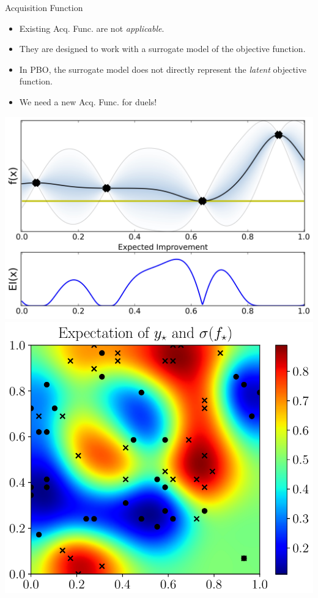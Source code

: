 \documentclass[13pt,aspectratio=1610]{beamer}
\begin{document}
\begin{frame}{Acquisition Function}
\begin{minipage}{0.65\textwidth}
\begin{itemize}
\item Existing Acq. Func. are not \emph{applicable}.
\item They are designed to work with a surrogate model of the objective function.
\item In PBO, the surrogate model does not directly represent the \emph{latent} objective function.
\item We need a new Acq. Func. for duels!
\end{itemize}
\end{minipage}
%
\begin{minipage}{0.33\textwidth}
\centering 
\includegraphics[width=1\textwidth]{EI.jpeg} \\
\includegraphics[width=.93\textwidth]{exp_y_star_cropped.pdf} 
\end{minipage}
\end{frame}
\end{document}
